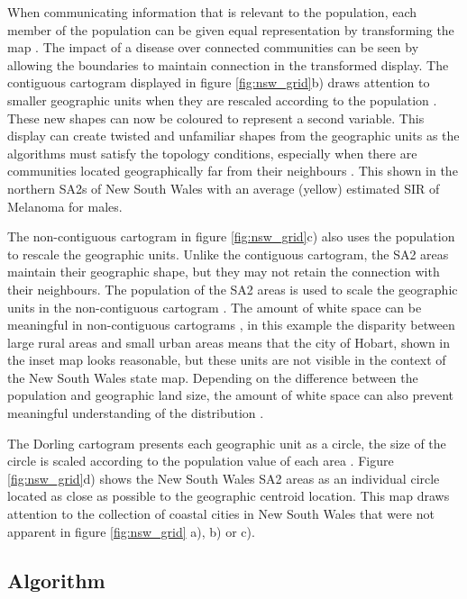 When communicating information that is relevant to the population, each
member of the population can be given equal representation by
transforming the map \citep{TVSSS}. The impact of a disease over
connected communities can be seen by allowing the boundaries to maintain
connection in the transformed display. The contiguous cartogram
displayed in figure \ref{fig:nsw_grid}b) draws attention to smaller
geographic units when they are rescaled according to the population
\citep{DMAHP}. These new shapes can now be coloured to represent a
second variable. This display can create twisted and unfamiliar shapes
from the geographic units as the algorithms must satisfy the topology
conditions, especially when there are communities located geographically
far from their neighbours \citep{TVSSS}. This shown in the northern SA2s
of New South Wales with an average (yellow) estimated SIR of Melanoma
for males.

The non-contiguous cartogram in figure \ref{fig:nsw_grid}c) also uses
the population to rescale the geographic units. Unlike the contiguous
cartogram, the SA2 areas maintain their geographic shape, but they may
not retain the connection with their neighbours. The population of the
SA2 areas is used to scale the geographic units in the non-contiguous
cartogram \citep{NAC}. The amount of white space can be meaningful in
non-contiguous cartograms \citep{ECGC}, in this example the disparity
between large rural areas and small urban areas means that the city of
Hobart, shown in the inset map looks reasonable, but these units are not
visible in the context of the New South Wales state map. Depending on
the difference between the population and geographic land size, the
amount of white space can also prevent meaningful understanding of the
distribution \citep{TVSSS}.

The Dorling cartogram presents each geographic unit as a circle, the
size of the circle is scaled according to the population value of each
area \citep{ACTUC}. Figure \ref{fig:nsw_grid}d) shows the New South
Wales SA2 areas as an individual circle located as close as possible to
the geographic centroid location. This map draws attention to the
collection of coastal cities in New South Wales that were not apparent
in figure \ref{fig:nsw_grid} a), b) or c).

\hypertarget{algorithm}{%
\subsection{Algorithm}\label{algorithm}}


